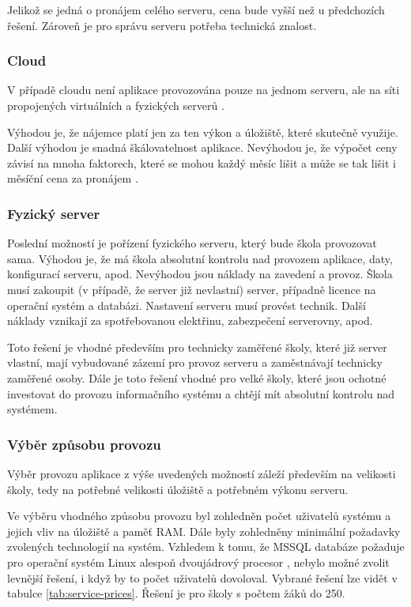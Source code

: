 Jelikož se jedná o pronájem celého serveru, cena bude vyšší než u předchozích řešení. Zároveň je pro správu serveru potřeba technická znalost. 

\subsubsection*{Cloud}
V případě cloudu není aplikace provozována pouze na jednom serveru, ale na síti propojených virtuálních a fyzických serverů \cite{what-is-cloud}.

Výhodou je, že nájemce platí jen za ten výkon a úložiště, které skutečně využije. Další výhodou je snadná škálovatelnost aplikace. Nevýhodou je, že výpočet ceny závisí na mnoha faktorech, které se mohou každý měsíc lišit a může se tak lišit i měsíční cena za pronájem \cite{cloud-cons}.

\subsubsection*{Fyzický server}
Poslední možností je pořízení fyzického serveru, který bude škola provozovat sama. 
Výhodou je, že má škola absolutní kontrolu nad provozem aplikace, daty, konfigurací serveru, apod. Nevýhodou jsou náklady na zavedení a provoz. Škola musí zakoupit (v případě, že server již nevlastní) server, případně licence na operační systém a databázi. Nastavení serveru musí provést technik. Další náklady vznikají za spotřebovanou elektřinu, zabezpečení serverovny, apod.

Toto řešení je vhodné především pro technicky zaměřené školy, které již server vlastní, mají vybudované zázemí pro provoz serveru a zaměstnávají technicky zaměřené osoby. Dále je toto řešení vhodné pro velké školy, které jsou ochotné investovat do provozu informačního systému a chtějí mít absolutní kontrolu nad systémem.

\subsubsection{Výběr způsobu provozu}
Výběr provozu aplikace z výše uvedených možností záleží především na velikosti školy, tedy na potřebné velikosti úložiště a potřebném výkonu serveru.

Ve výběru vhodného způsobu provozu byl zohledněn počet uživatelů systému a jejich vliv na úložiště a paměť RAM. Dále byly zohledněny minimální požadavky zvolených technologií na systém. Vzhledem k tomu, že MSSQL databáze požaduje pro operační systém Linux alespoň dvoujádrový procesor \cite{sqlserver-linux-req}, nebylo možné zvolit levnější řešení, i když by to počet uživatelů dovoloval. Vybrané řešení lze vidět v tabulce \ref{tab:service-prices}. Řešení je pro školy s počtem žáků do 250.
\clearpage


